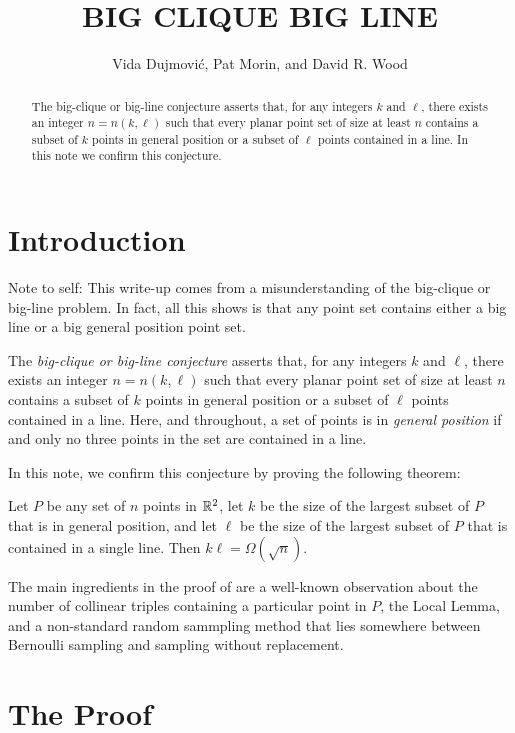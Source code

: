 \documentclass{patmorin}
\title{\MakeUppercase{Big Clique Big Line}}
\author{Vida Dujmovi\'c, Pat Morin, and David R. Wood}
\begin{document}
\maketitle

\begin{abstract}
The big-clique or big-line conjecture asserts that, for any integers $k$
and $\ell$, there exists an integer $n=n(k,\ell)$ such that every planar
point set of size at least $n$ contains a subset of $k$ points in general
position or a subset of $\ell$ points contained in a line.
In this note we confirm this conjecture.
\end{abstract}

\section{Introduction}

Note to self: This write-up comes from a misunderstanding of the
big-clique or big-line problem.  In fact, all this shows is that any
point set contains either a big line or a big general position point set.

The \emph{big-clique or big-line conjecture} asserts that, for any
integers $k$ and $\ell$, there exists an integer $n=n(k,\ell)$ such
that every planar point set of size at least $n$ contains a subset of
$k$ points in general position or a subset of $\ell$ points contained
in a line.  Here, and throughout, a set of points is in \emph{general
position} if and only no three points in the set are contained in a line.


In this note, we confirm this conjecture by proving the following theorem:
\begin{thm}
Let $P$ be any set of $n$ points in $\mathbb{R}^2$, let $k$ be the size of the
largest subset of $P$ that is in general position, and let $\ell$ be the
size of the largest subset of $P$ that is contained in a single line.
Then $k\ell = \Omega(\sqrt{n})$.
\end{thm}

The main ingredients in the proof of  are a well-known
observation about the number of collinear triples containing a particular
point in $P$, the Local Lemma, and a non-standard random sammpling
method that lies somewhere between Bernoulli sampling and sampling
without replacement.

\section{The Proof}
\end{document}
